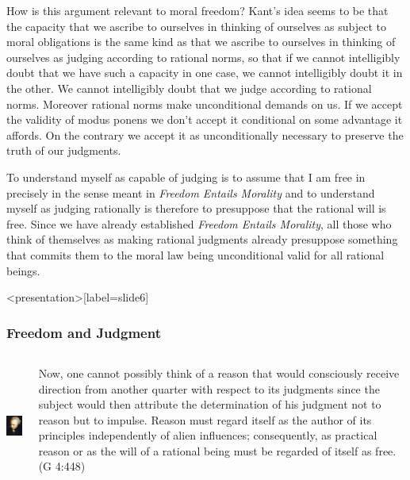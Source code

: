 How is this argument relevant to moral freedom? Kant’s idea seems to be that the capacity that we ascribe to ourselves in thinking of ourselves as subject to moral obligations is the same kind as that we ascribe to ourselves in thinking of ourselves as judging according to rational norms, so that if we cannot intelligibly doubt that we have such a capacity in one case, we cannot intelligibly doubt it in the other. We cannot intelligibly doubt that we judge according to rational norms. Moreover rational norms make unconditional demands on us. If we accept the validity of modus ponens we don’t accept it conditional on some advantage it affords. On the contrary we accept it as unconditionally necessary to preserve the truth of our judgments.

To understand myself as capable of judging is to assume that I am free in precisely in the sense meant in \emph{Freedom Entails Morality} and to understand myself as judging rationally is therefore to presuppose that the rational will is free. Since we have already established \emph{Freedom Entails Morality}, all those who think of themselves as making rational judgments already presuppose something that commits them to the moral law being unconditional valid for all rational beings. \change

\begin{frame}<presentation>[label=slide6]
    \frametitle{Freedom and Judgment}
        \begin{columns}
            \begin{column}{3cm}
                \includegraphics[height=4cm]{../../graphics/kant.jpg}
            \end{column}
            \begin{column}{7cm}
                Now, one cannot possibly think of a reason that would consciously receive direction from another quarter with respect to its judgments since the subject would then attribute the determination of his judgment not to reason but to impulse. Reason must regard itself as the author of its principles independently of alien influences; consequently, as practical reason or as the will of a rational being must be regarded of itself as free. (G 4:448)
            \end{column}
        \end{columns}
\end{frame}

